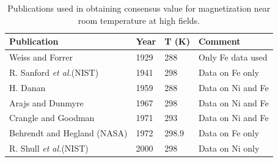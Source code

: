 \documentclass[preprint,12pt]{elsarticle}
\begin{document}
\begin{table}[h]
\caption{\label{tab:magnetization_pubs}Publications used in obtaining consensus value for magnetization near room temperature at high fields.}
\begin{center}
\begin{tabular}{|l|l|l|l|}\hline
Publication & Year & T (K) & Comment\\\hline
Weiss and Forrer \cite{Weiss1929} & 1929 & 288 & Only Fe data used\\
R. Sanford {\it et al.}(NIST)\cite{Sanford1941} & 1941 & 298 & Data on Fe only\\
H. Danan \cite{Danan1959} & 1959 & 288 & Data on Ni and Fe\\
Arajs and Dunmyre \cite{Arajs1967}& 1967 & 298 & Data on Ni and Fe\\
Crangle and Goodman \cite{Crangle1971} & 1971 & 293 & Data on Ni and Fe\\
Behrendt and Hegland (NASA)\cite{Behrendt1972} & 1972 & 298.9 & Data on Fe only\\
R. Shull {\it et al.}(NIST) & 2000 & 298 & Data on Ni only\\\hline
\end{tabular}
\end{center}
\end{table}
\end{document}

